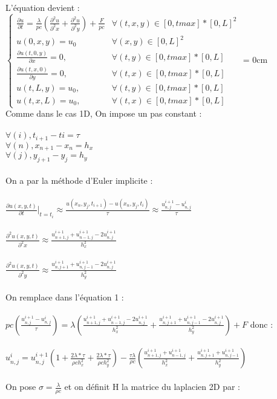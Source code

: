 \documentclass[french]{report}
\begin{document}
L’équation devient :
\bigbreak
$\begin{cases}
\frac{\partial u}{\partial t} =\frac{\lambda}{pc}( \frac{\partial^2 u}{\partial^2 x}+\frac{\partial^2u}{\partial^2 y}) + \frac{F}{pc} &\forall(t,x,y) \in [0,tmax]*[0,L]^2 \\
u(0,x,y) = u_0 &\forall(x,y) \in [0,L]^2
\\
\frac{\partial u(t,0,y)}{\partial x} = 0, &\forall(t,y) \in [0,tmax] * [0,L]
\\
\frac{\partial u(t,x,0)}{\partial y} = 0, &\forall(t,x) \in [0,tmax] * [0,L]
\\
u(t,L,y)=u_0, &\forall(t,y) \in [0,tmax]*[0,L]
\\
u(t,x,L)=u_0, &\forall(t,x) \in [0,tmax]*[0,L]
\end{cases}$
\leftskip=3cm
\bigbreak
\leftskip = 0cm
\\
Comme dans le cas 1D, On impose un pas constant :\\\\
$\forall(i), t_{i+1} - t{i} = \tau$ \\
$\forall(n), x_{n+1} - x_{n} = h_x $ \\
$\forall(j), y_{j+1} - y_{j} = h_y $ \\\\
On a par la méthode d'Euler implicite :\\\\
$\frac{\partial u(x,y,t)}{\partial t}|_{t=t_i} \approx \frac{u(x_n,y_j,t_{i+1})-u(x_n,y_j,t_{i})}{\tau} \approx \frac{u_{n,j}^{i+1}-u_{n,j}^{i}}{\tau}$\\\\
$\frac{\partial^2 u(x,y,t)}{\partial^2 x} \approx \frac{u_{n+1,j}^{i+1}+u_{n-1,j}^{i+1} -2u_{n,j}^{i+1} }{h_x^2}$\\\\
$\frac{\partial^2 u(x,y,t)}{\partial^2 y} \approx \frac{u_{n,j+1}^{i+1}+u_{n,j-1}^{i+1} -2u_{n,j}^{i+1} }{h_y^2}$\\\\
On remplace dans l'équation 1 :\\\\
$pc (\frac{u_{n,j}^{i+1}-u_{n,j}^{i}}{\tau}) = \lambda(\frac{u_{n+1,j}^{i+1}+u_{n-1,j}^{i+1} -2u_{n,j}^{i+1} }{h_x^2} + \frac{u_{n,j+1}^{i+1}+u_{n,j-1}^{i+1} -2u_{n,j}^{i+1} }{h_y^2}) +F$ donc :\\\\ 
$u_{n,j}^{i}=u_{n,j}^{i+1}(1+\frac{2\lambda*\tau}{\rho c h_x^2}+\frac{2\lambda*\tau}{\rho c h_y^2})-\frac{\tau\lambda}{\rho c}(\frac{u_{n+1,j}^{i+1}+u_{n-1,j}^{i+1}  }{h_x^2}+\frac{u_{n,j+1}^{i+1}+u_{n,j-1}^{i+1}  }{h_y^2}) $\\\\
On pose $\sigma =\frac{\lambda}{\rho c}$ et on définit H la matrice du laplacien 2D par :\\\\
\end{document}

